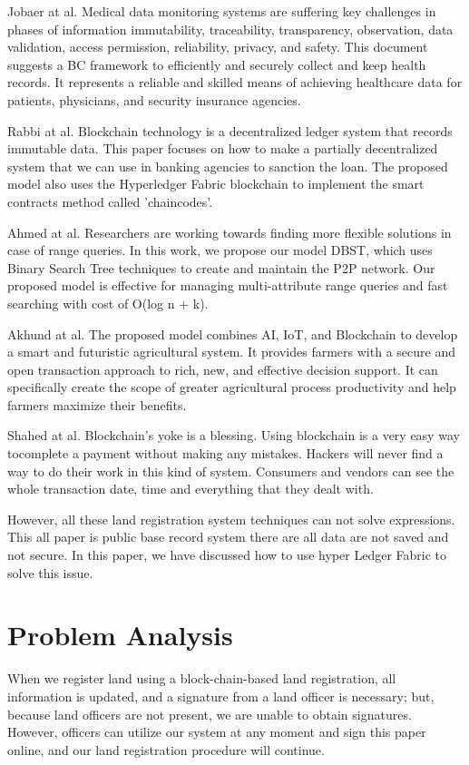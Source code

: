 \documentclass[12pt]{ucthesis}
\begin{document}
Jobaer at al.\cite{mist2021} Medical data monitoring systems are suffering key challenges in phases of information immutability, traceability, transparency, observation, data validation, access permission, reliability, privacy, and safety. This document suggests a BC framework to efficiently and securely collect and keep health records. It represents a reliable and skilled means of achieving healthcare data for patients, physicians, and security insurance agencies.

Rabbi at al.\cite{rabbi2021bls} Blockchain technology is a decentralized ledger system that records immutable data. This paper focuses on how to make a partially decentralized system that we can use in banking agencies to sanction the loan. The proposed model also uses the Hyperledger Fabric blockchain to implement the smart contracts method called 'chaincodes'.

Ahmed at al.\cite{ahmed2021dbst} Researchers are working towards finding more flexible solutions in case of range queries. In this work, we propose our model DBST, which uses Binary Search Tree techniques to create and maintain the P2P network. Our proposed model is effective for managing multi-attribute range queries and fast searching with cost of O(log n + k).

Akhund at al.\cite{biswas2021biot} The proposed model combines AI, IoT, and Blockchain to develop a smart and futuristic agricultural system. It provides farmers with a secure and open transaction approach to rich, new, and effective decision support. It can specifically create the scope of greater agricultural process productivity and help farmers maximize their benefits.

Shahed at al.\cite{ahamed2021bps} Blockchain's yoke is a blessing. Using blockchain is a very easy way tocomplete a payment without making any mistakes. Hackers will never find a way to do their work in this kind of system. Consumers and vendors can see the whole transaction date, time and everything that they dealt with.


However, all these land registration system techniques can not solve
expressions. This all paper is public base record system there are all data are not saved and not secure.
In this paper, we have discussed how to use hyper Ledger Fabric to solve this issue.

\section{Problem Analysis}
\label{problemanalysis}
    When we register land using a block-chain-based land registration, all information is updated, and a signature from a land officer is necessary; but, because land officers are not present, we are unable to obtain signatures. However, officers can utilize our system at any moment and sign this paper online, and our land registration procedure will continue. 
\end{document}
